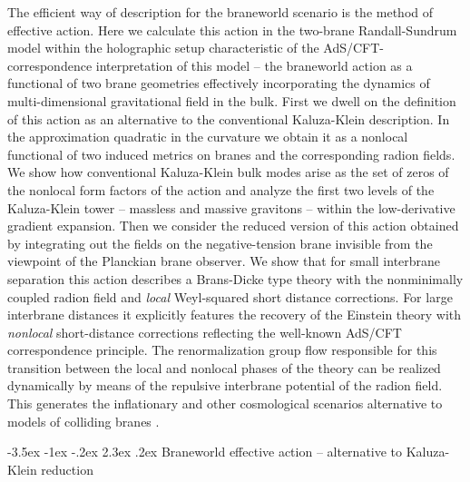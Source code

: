 \documentclass[a4paper,12pt]{article}
\makeatletter
\renewcommand\section{\@startsection {section}{1}{\z@}%
                                   {-3.5ex \@plus -1ex \@minus -.2ex}%
                                   {2.3ex \@plus.2ex}%
                                   {\normalfont\large\bfseries}}
\makeatother
\begin{document}
The efficient way of description for the braneworld scenario is
the method of effective action. Here we calculate this action in
the two-brane Randall-Sundrum model within the holographic setup
characteristic of the AdS/CFT-correspondence interpretation of this
model \cite{Gubser,GKR,HHR1} -- the braneworld action as a
functional of two brane
geometries effectively incorporating the dynamics of multi-dimensional
gravitational field in the bulk. First we dwell on the definition
of this action as an alternative to the conventional Kaluza-Klein
description. In the approximation quadratic in the curvature we
obtain it as a nonlocal functional of two
induced metrics on branes and the corresponding radion fields. We show
how conventional Kaluza-Klein bulk modes arise as the set of zeros of
the nonlocal form factors of the action and analyze the first two
levels of the Kaluza-Klein tower -- massless and massive gravitons --
within the low-derivative gradient expansion. Then we consider the
reduced version of this action obtained by integrating out the fields
on the negative-tension brane invisible from the viewpoint of the
Planckian brane observer.  We show that for small interbrane separation
this action describes a Brans-Dicke type theory with the nonminimally
coupled radion field and {\em local} Weyl-squared short distance
corrections. For large interbrane distances it explicitly features
the recovery of the Einstein theory with {\em nonlocal} short-distance
corrections reflecting the well-known AdS/CFT correspondence
principle. The renormalization group flow responsible for this
transition between the local and nonlocal phases of the theory
can be realized dynamically by means of the repulsive interbrane
potential of the radion field. This generates the inflationary
\cite{brane} and other cosmological scenarios alternative to
models of colliding branes \cite{DTye,Ekpyr}.


\section{Braneworld effective action --
alternative to Kaluza-Klein reduction} \label{sec:1}
\end{document}
